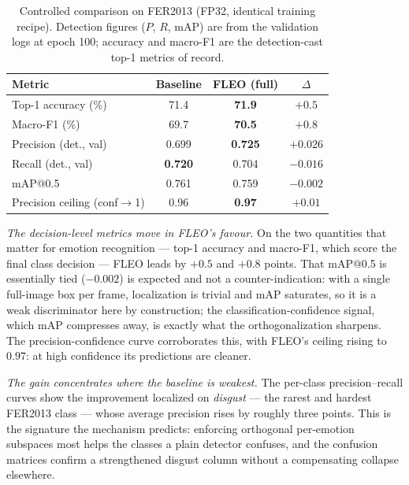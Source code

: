 \documentclass[onecolumn,journal]{IEEEtran}
\begin{document}
\begin{table}[t]
\centering
\caption{Controlled comparison on FER2013 (FP32, identical training recipe). Detection
figures ($P$, $R$, mAP) are from the validation logs at epoch 100; accuracy and macro-F1
are the detection-cast top-1 metrics of record.}
\label{tab:ablation}
\setlength{\tabcolsep}{6pt}
\renewcommand{\arraystretch}{1.25}
\begin{tabular}{lcc c}
\toprule
Metric & Baseline & FLEO (full) & $\Delta$\\
\midrule
Top-1 accuracy (\%)     & 71.4 & \textbf{71.9} & $+0.5$\\
Macro-F1 (\%)           & 69.7 & \textbf{70.5} & $+0.8$\\
Precision (det., val)   & 0.699 & \textbf{0.725} & $+0.026$\\
Recall (det., val)      & \textbf{0.720} & 0.704 & $-0.016$\\
mAP@0.5                 & 0.761 & 0.759 & $-0.002$\\
Precision ceiling (conf$\to$1) & 0.96 & \textbf{0.97} & $+0.01$\\
\bottomrule
\end{tabular}
\end{table}

\emph{The decision-level metrics move in FLEO's favour.} On the two quantities that
matter for emotion recognition --- top-1 accuracy and macro-F1, which score the final
class decision --- FLEO leads by $+0.5$ and $+0.8$ points. That mAP@0.5 is essentially
tied ($-0.002$) is expected and not a counter-indication: with a single full-image box
per frame, localization is trivial and mAP saturates, so it is a weak discriminator here
by construction; the classification-confidence signal, which mAP compresses away, is
exactly what the orthogonalization sharpens. The precision-confidence curve corroborates
this, with FLEO's ceiling rising to $0.97$: at high confidence its predictions are
cleaner.

\emph{The gain concentrates where the baseline is weakest.} The per-class
precision--recall curves show the improvement localized on \emph{disgust} --- the rarest
and hardest FER2013 class --- whose average precision rises by roughly three points.
This is the signature the mechanism predicts: enforcing orthogonal per-emotion subspaces
most helps the classes a plain detector confuses, and the confusion matrices confirm a
strengthened disgust column without a compensating collapse elsewhere.
\end{document}
